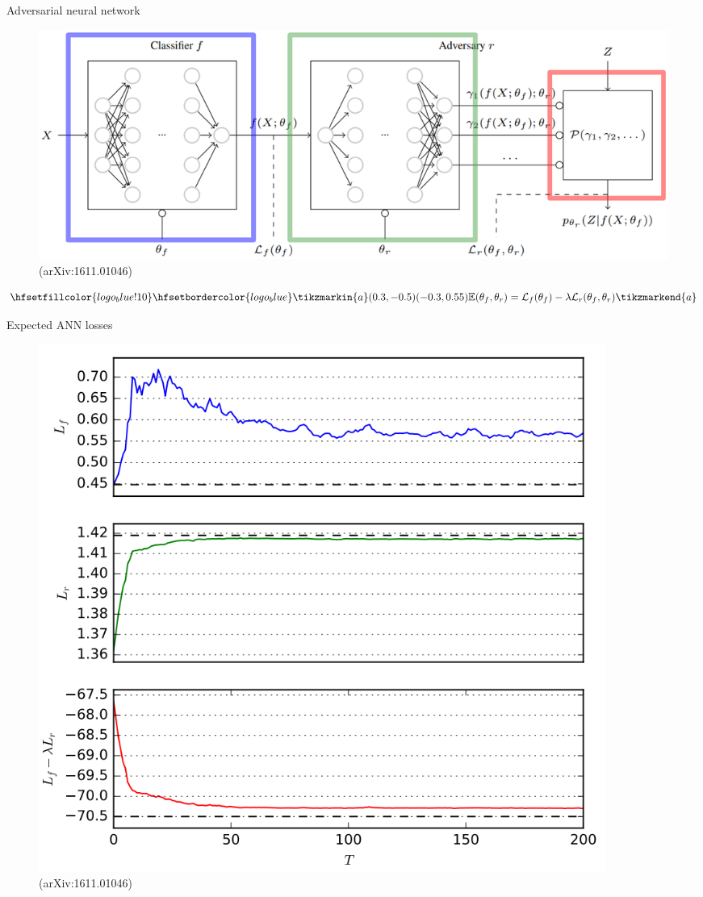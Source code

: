 \begin{frame}{Adversarial neural network}
\vspace{-0.3cm}
    \begin{figure}
        \centering
        \includegraphics[width=\textwidth]{figures_theory/ANN_paper.eps}
        \caption{(arXiv:1611.01046)}
    \end{figure}
    \begin{equation*}
        \hfsetfillcolor{logo_blue!10}
        \hfsetbordercolor{logo_blue}
        \tikzmarkin{a}(0.3,-0.5)(-0.3,0.55)
        \mathbb{E}(\theta_f, \theta_r) = \mathcal{L}_f(\theta_f) - \lambda \mathcal{L}_r(\theta_f, \theta_r)
        \tikzmarkend{a}
    \end{equation*}
\end{frame}

\begin{frame}{Expected ANN losses}
    \begin{figure}
        \centering
        \includegraphics[width=0.9\textwidth]{figures_theory/losses_paper}
        \caption{(arXiv:1611.01046)}
    \end{figure}
\end{frame}